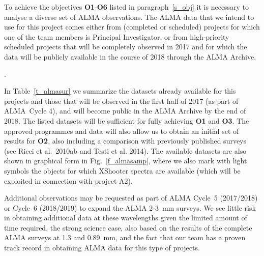 \documentclass[10pt,fleqn,twoside]{article}
\begin{document}
To achieve the objectives {\bf O1}-{\bf O6} listed in paragraph~\ref{s_obj} it is necessary to analyse a diverse set of ALMA observations. The ALMA data that we intend to use for this project comes either from (completed or scheduled) projects for which one of the team members is Principal Investigator, or from high-priority scheduled projects that will be completely observed in 2017 and for which the data will be publicly available in the course of 2018 through the ALMA Archive.

\vspace{1em}{\Tcol\bf ALMA Data for objectives O1, O2, and O3}.

In Table~\ref{t_almasur} we summarize the datasets already available for this projects and those that will be observed in the first half of 2017 (as part of ALMA~Cycle 4), and will become public in the ALMA Archive by the end of 2018. The listed datasets will be sufficient for fully achieving {\bf O1} and {\bf O3}. The approved programmes and data will also allow us to obtain an initial set of results for {\bf O2}, also including a comparison with previously published surveys (see Ricci et al.~2010ab and Testi et al. 2014).
The available datasets are also shown in graphical form in Fig.~\ref{f_almasamp}, where we also mark with light symbols the objects for which XShooter spectra are available (which will be exploited in connection with project A2).

Additional observations may be requested as part of ALMA Cycle~5 (2017/2018) or Cycle~6 (2018/2019) to expand the ALMA 2-3~mm surveys. We see little risk in obtaining additional data at these wavelengths given the limited amount of time required, the strong science case, also based on the results of the complete ALMA surveys at 1.3 and 0.89~mm, and the fact that our team has a proven track record in obtaining ALMA data for this type of projects.
\end{document}
